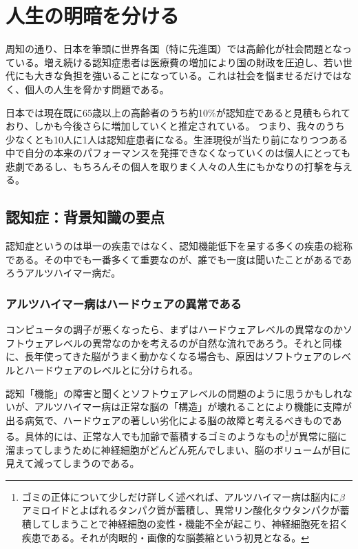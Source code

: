 \section{人生の明暗を分ける}
周知の通り、日本を筆頭に世界各国（特に先進国）では高齢化が社会問題となっている。増え続ける認知症患者は医療費の増加により国の財政を圧迫し、若い世代にも大きな負担を強いることになっている。これは社会を悩ませるだけではなく、個人の人生を脅かす問題である。

日本では現在既に65歳以上の高齢者のうち約10\%が認知症であると見積もられており、しかも今後さらに増加していくと推定されている。
つまり、我々のうち少なくとも10人に1人は認知症患者になる。生涯現役が当たり前になりつつある中で自分の本来のパフォーマンスを発揮できなくなっていくのは個人にとっても悲劇であるし、もちろんその個人を取りまく人々の人生にもかなりの打撃を与える。

\subsection{認知症：背景知識の要点}
認知症というのは単一の疾患ではなく、認知機能低下を呈する多くの疾患の総称である。その中でも一番多くて重要なのが、誰でも一度は聞いたことがあるであろうアルツハイマー病だ。

\subsubsection{アルツハイマー病はハードウェアの異常である}
コンピュータの調子が悪くなったら、まずはハードウェアレベルの異常なのかソフトウェアレベルの異常なのかを考えるのが自然な流れであろう。それと同様に、長年使ってきた脳がうまく動かなくなる場合も、原因はソフトウェアのレベルとハードウェアのレベルとに分けられる。

認知「機能」の障害と聞くとソフトウェアレベルの問題のように思うかもしれないが、アルツハイマー病は正常な脳の「構造」が壊れることにより機能に支障が出る病気で、ハードウェアの著しい劣化による脳の故障と考えるべきものである。具体的には、正常な人でも加齢で蓄積するゴミのようなもの\footnote{ゴミの正体について少しだけ詳しく述べれば、アルツハイマー病は脳内に$\beta$アミロイドとよばれるタンパク質が蓄積し、異常リン酸化タウタンパクが蓄積してしまうことで神経細胞の変性・機能不全が起こり、神経細胞死を招く疾患である。それが肉眼的・画像的な脳萎縮という初見となる。}が異常に脳に溜まってしまうために神経細胞がどんどん死んでしまい、脳のボリュームが目に見えて減ってしまうのである。

